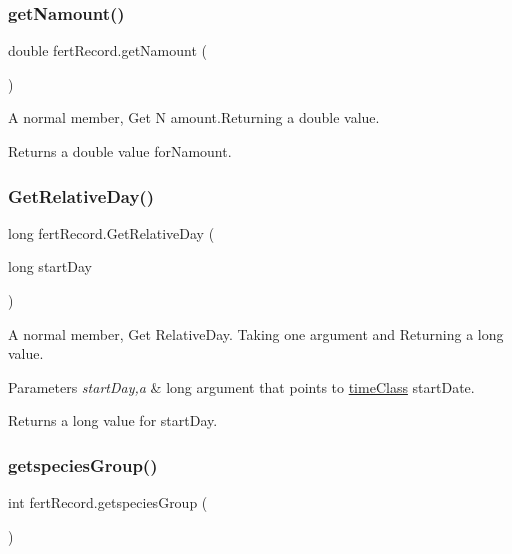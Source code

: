 \subsubsection{\texorpdfstring{getNamount()}{getNamount()}}
{\footnotesize\ttfamily double fert\+Record.\+get\+Namount (\begin{DoxyParamCaption}{ }\end{DoxyParamCaption})\hspace{0.3cm}{\ttfamily [inline]}}



A normal member, Get N amount.\+Returning a double value. 

\begin{DoxyReturn}{Returns}
a double value for\+Namount. 
\end{DoxyReturn}
\mbox{\label{classfert_record_a54e59e6321610b1d3f5b323932f2347a}} 
\subsubsection{\texorpdfstring{GetRelativeDay()}{GetRelativeDay()}}
{\footnotesize\ttfamily long fert\+Record.\+Get\+Relative\+Day (\begin{DoxyParamCaption}\item[{long}]{start\+Day }\end{DoxyParamCaption})\hspace{0.3cm}{\ttfamily [inline]}}



A normal member, Get Relative\+Day. Taking one argument and Returning a long value. 


\begin{DoxyParams}{Parameters}
{\em start\+Day,a} & long argument that points to \mbox{\hyperlink{classtime_class}{time\+Class}} start\+Date. \\
\hline
\end{DoxyParams}
\begin{DoxyReturn}{Returns}
a long value for start\+Day. 
\end{DoxyReturn}
\mbox{\label{classfert_record_a50f47d7b4c2dc0d6349e34b1acb4ffad}} 
\subsubsection{\texorpdfstring{getspeciesGroup()}{getspeciesGroup()}}
{\footnotesize\ttfamily int fert\+Record.\+getspecies\+Group (\begin{DoxyParamCaption}{ }\end{DoxyParamCaption})\hspace{0.3cm}{\ttfamily [inline]}}



